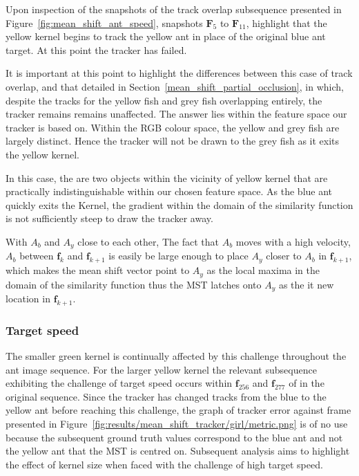 Upon inspection of the snapshots of the track overlap subsequence presented in
Figure~\ref{fig:mean_shift_ant_speed}, snapshots $\mathbf{F}_5$ to
$\mathbf{F}_{11}$, highlight that the yellow kernel begins to track the yellow
ant in place of the original blue ant target. At this point the tracker has
failed.

It is important at this point to highlight the differences between this case of
track overlap, and that detailed in Section~\ref{mean_shift_partial_occlusion},
in which, despite the tracks for the yellow fish and grey fish overlapping
entirely, the tracker remains remains unaffected.
The answer lies within the feature space our tracker is based on. Within the RGB colour space,
the yellow and grey fish are largely distinct. Hence the tracker will not be
drawn to the grey fish as it exits the yellow kernel.

In this case, the are two objects within the vicinity of yellow kernel that are practically
indistinguishable within our chosen feature space. As the blue ant quickly exits
the Kernel, the gradient within the domain of the similarity
function is not sufficiently steep to draw the tracker away.

With $A_b$ and $A_y$ close to each other, The fact that $A_b$ moves with a high
velocity, $A_b$ between $\mathbf{f}_k$ and $\mathbf{f}_{k+1}$ is easily be large
enough to place $A_y$ closer to $A_b$ in $\mathbf{f}_{k+1}$, which makes the
mean shift vector point to $A_{y}$ as the local maxima in the domain of the
similarity function thus the MST latches onto $A_y$ as the it new location in
$\mathbf{f}_{k+1}$.

\subsubsection{Target speed}\label{mean_shift_target_speed}
The smaller green kernel is continually affected by this challenge throughout
the ant image sequence.
For the larger yellow kernel the relevant subsequence exhibiting the challenge
of target speed occurs within $\mathbf{f}_{256}$ and $\mathbf{f}_{277}$ of in
the original sequence. 
Since the tracker has changed tracks from the blue to the yellow ant before
reaching this challenge, the graph of tracker error against frame presented in
Figure~\ref{fig:results/mean_shift_tracker/girl/metric.png} is of no use because
the subsequent ground truth values correspond to the blue ant and not the yellow
ant that the MST is centred on. Subsequent analysis aims to highlight the effect
of kernel size when faced with the challenge of high target speed.

